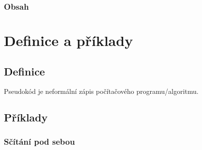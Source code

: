 \documentclass[aspectratio=169,11pt]{beamer}
\begin{document}
\begin{frame}
 \frametitle{Obsah}
 \tableofcontents
\end{frame}

\section[Definice a příklady]{Definice a příklady}
\subsection[Definice]{Definice}

\begin{frame}
 \begin{tcolorbox}[title=Pseudokód,center,width=.95\textwidth]
  Pseudokód je \alert{neformální} zápis počítačového programu/algoritmu.
 \end{tcolorbox}
\end{frame}

\subsection[Příklady]{Příklady}

\begin{frame}
 \frametitle{Sčítání pod sebou}
 \centering
 \begin{minipage}{.8\textwidth}
 \end{minipage}
\end{frame}
\end{document}
